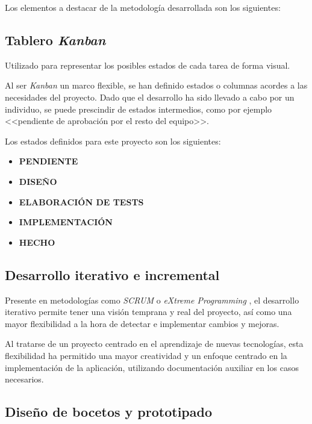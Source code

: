 \documentclass[10pt, a4paper]{aqademic}
\begin{document}
\medskip

Los elementos a destacar de la metodología desarrollada son los siguientes:

\subsection*{Tablero \textit{Kanban}}

Utilizado para representar los posibles estados de cada tarea de forma visual.

\medskip

Al ser \textit{Kanban} un marco flexible, se han definido estados o columnas acordes a las necesidades del proyecto. Dado que el desarrollo ha sido llevado a cabo por un individuo, se puede prescindir de estados intermedios, como por ejemplo <<pendiente de aprobación por el resto del equipo>>.

\medskip

Los estados definidos para este proyecto son los siguientes:

\begin{itemize}
	\item \textbf{PENDIENTE}
	\item \textbf{DISEÑO}
	\item \textbf{ELABORACIÓN DE TESTS}
	\item \textbf{IMPLEMENTACIÓN}
	\item \textbf{HECHO}
\end{itemize}


\subsection*{Desarrollo iterativo e incremental}

Presente en metodologías como \textit{SCRUM} \cite{Schwaber04} o \textit{eXtreme Programming} \cite{BecAnd04extreme}, el desarrollo iterativo permite tener una visión temprana y real del proyecto, así como una mayor flexibilidad a la hora de detectar e implementar cambios y mejoras.

\medskip

Al tratarse de un proyecto centrado en el aprendizaje de nuevas tecnologías, esta flexibilidad ha permitido una mayor creatividad y un enfoque centrado en la implementación de la aplicación, utilizando documentación auxiliar en los casos necesarios.


\subsection*{Diseño de bocetos y prototipado}
\end{document}
